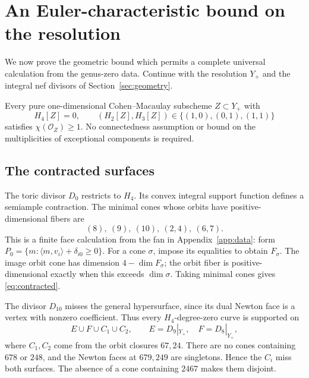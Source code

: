 \section{An Euler-characteristic bound on the resolution}\label{sec:euler}

We now prove the geometric bound which permits a complete universal
calculation from the genus-zero data. Continue with the resolution
$Y_+$ and the integral nef divisors of Section~\ref{sec:geometry}.

\begin{theorem}\label{thm:euler}
Every pure one-dimensional Cohen--Macaulay subscheme $Z\subset Y_+$
with
\[
 H_4[Z]=0,\qquad (H_2[Z],H_3[Z])\in\{(1,0),(0,1),(1,1)\}
\]
satisfies $\chi(\mathcal O_Z)\ge1$. No connectedness assumption or
bound on the multiplicities of exceptional components is required.
\end{theorem}

\subsection{The contracted surfaces}
The toric divisor $D_0$ restricts to $H_4$. Its convex integral support
function defines a semiample contraction. The minimal cones whose
orbits have positive-dimensional fibers are
\begin{equation}\label{eq:contracted}
 (8),\ (9),\ (10),\ (2,4),\ (6,7).
\end{equation}
This is a finite face calculation from the fan in Appendix~\ref{app:data}:
form $P_0=\{m:\langle m,v_i\rangle+\delta_{i0}\ge0\}$.
For a cone $\sigma$, impose its equalities to obtain $F_\sigma$.
The image orbit cone has dimension $4-\dim F_\sigma$; the orbit fiber
is positive-dimensional exactly when this exceeds $\dim\sigma$.
Taking minimal cones gives \eqref{eq:contracted}.

The divisor $D_{10}$ misses the general hypersurface, since its dual
Newton face is a vertex with nonzero coefficient. Thus every
$H_4$-degree-zero curve is supported on
\[
 E\cup F\cup C_1\cup C_2,
 \qquad E=D_9|_{Y_+},\quad F=D_8|_{Y_+},
\]
where $C_1,C_2$ come from the orbit closures $67,24$.
There are no cones containing $678$ or $248$, and the Newton faces at
$679,249$ are singletons. Hence the $C_i$ miss both surfaces.
The absence of a cone containing $2467$ makes them disjoint.

